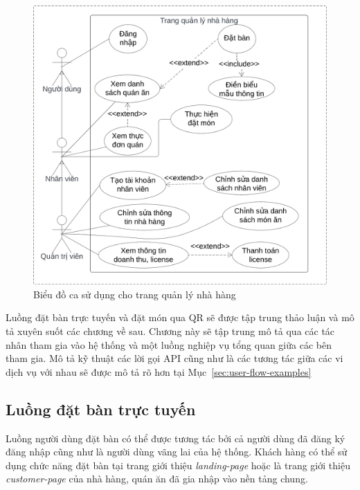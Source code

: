 \begin{figure}[H]
	\centering
	\includegraphics[width=\textwidth]{images/hChip/main-flow/admin-page-use-case-diagram.png}
	\caption{Biểu đồ ca sử dụng cho trang quản lý nhà hàng }
	\label{fig:admin-page-use-case}
\end{figure}

Luồng đặt bàn trực tuyến và đặt món qua QR sẽ được tập trung thảo luận và mô tả xuyên suốt các chương về sau.
Chương này sẽ tập trung mô tả qua các tác nhân tham gia vào hệ thống và một luồng nghiệp vụ tổng quan giữa các bên tham gia.
Mô tả kỹ thuật các lời gọi API cũng như là các tương tác giữa các vi dịch vụ với nhau sẽ được mô tả rõ hơn tại Mục~\autoref{sec:user-flow-examples}

\subsection*{Luồng đặt bàn trực tuyến}\label{sec:reservation-flow}
Luồng người dùng đặt bàn có thể được tương tác bởi cả người dùng đã đăng ký đăng nhập cũng như là người dùng vãng lai của hệ thống.
Khách hàng có thể sử dụng chức năng đặt bàn tại trang giới thiệu \textit{landing-page} hoặc là trang giới thiệu \textit{customer-page} của nhà hàng, quán ăn đã gia nhập vào nền tảng chung.


